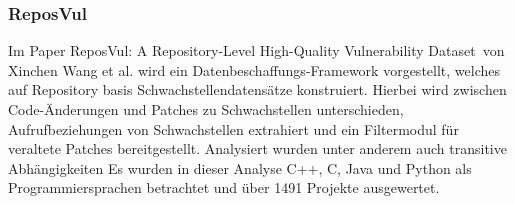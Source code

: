 \subsubsection{ReposVul} \label{sec:ReposVul}
    Im Paper \glqq ReposVul: A Repository-Level High-Quality Vulnerability Dataset\grqq~von Xinchen Wang et al. wird ein Datenbeschaffungs-Framework vorgestellt, welches auf Repository basis Schwachstellendatensätze konstruiert. %
    Hierbei wird zwischen Code-Änderungen und Patches zu Schwachstellen unterschieden, Aufrufbeziehungen von Schwachstellen extrahiert und ein Filtermodul für veraltete Patches bereitgestellt.
    Analysiert wurden unter anderem auch transitive Abhängigkeiten
    Es wurden in dieser Analyse C++, C, Java und Python als Programmiersprachen betrachtet und über 1491 Projekte ausgewertet.
    